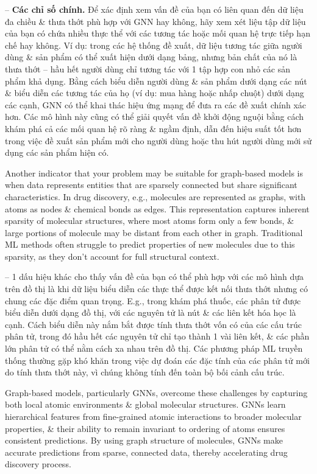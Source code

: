 \documentclass{article}
\begin{document}
\begin{itemize}
\begin{itemize}
\begin{itemize}
            -- {\bf Các chỉ số chính.} Để xác định xem vấn đề của bạn có liên quan đến dữ liệu đa chiều \& thưa thớt phù hợp với GNN hay không, hãy xem xét liệu tập dữ liệu của bạn có chứa nhiều thực thể với các tương tác hoặc mối quan hệ trực tiếp hạn chế hay không. Ví dụ: trong các hệ thống đề xuất, dữ liệu tương tác giữa người dùng \& sản phẩm có thể xuất hiện dưới dạng bảng, nhưng bản chất của nó là thưa thớt -- hầu hết người dùng chỉ tương tác với 1 tập hợp con nhỏ các sản phẩm khả dụng. Bằng cách biểu diễn người dùng \& sản phẩm dưới dạng các nút \& biểu diễn các tương tác của họ (ví dụ: mua hàng hoặc nhấp chuột) dưới dạng các cạnh, GNN có thể khai thác hiệu ứng mạng để đưa ra các đề xuất chính xác hơn. Các mô hình này cũng có thể giải quyết vấn đề khởi động nguội bằng cách khám phá cả các mối quan hệ rõ ràng \& ngầm định, dẫn đến hiệu suất tốt hơn trong việc đề xuất sản phẩm mới cho người dùng hoặc thu hút người dùng mới sử dụng các sản phẩm hiện có.

            Another indicator that your problem may be suitable for graph-based models is when data represents entities that are sparsely connected but share significant characteristics. In drug discovery, e.g., molecules are represented as graphs, with atoms as nodes \& chemical bonds as edges. This representation captures inherent sparsity of molecular structures, where most atoms form only a few bonds, \& large portions of molecule may be distant from each other in graph. Traditional ML methods often struggle to predict properties of new molecules due to this sparsity, as they don't account for full structural context.

            -- 1 dấu hiệu khác cho thấy vấn đề của bạn có thể phù hợp với các mô hình dựa trên đồ thị là khi dữ liệu biểu diễn các thực thể được kết nối thưa thớt nhưng có chung các đặc điểm quan trọng. E.g., trong khám phá thuốc, các phân tử được biểu diễn dưới dạng đồ thị, với các nguyên tử là nút \& các liên kết hóa học là cạnh. Cách biểu diễn này nắm bắt được tính thưa thớt vốn có của các cấu trúc phân tử, trong đó hầu hết các nguyên tử chỉ tạo thành 1 vài liên kết, \& các phần lớn phân tử có thể nằm cách xa nhau trên đồ thị. Các phương pháp ML truyền thống thường gặp khó khăn trong việc dự đoán các đặc tính của các phân tử mới do tính thưa thớt này, vì chúng không tính đến toàn bộ bối cảnh cấu trúc.

            Graph-based models, particularly GNNs, overcome these challenges by capturing both local atomic environments \& global molecular structures. GNNs learn hierarchical features from fine-grained atomic interactions to broader molecular properties, \& their ability to remain invariant to ordering of atoms ensures consistent predictions. By using graph structure of molecules, GNNs make accurate predictions from sparse, connected data, thereby accelerating drug discovery process.


\end{itemize}
\end{itemize}
\end{itemize}
\end{document}
